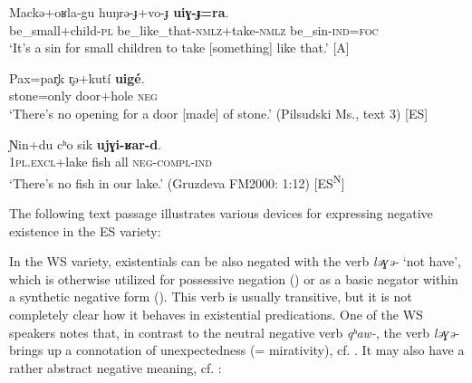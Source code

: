 \documentclass[output=paper,colorlinks,citecolor=brown]{langscibook}
\begin{document}
\ea\label{ex:niv:38}
    \gll Mackə+oʁla-gu huŋrə{}-ɟ+vo-ɟ \textbf{uiɣ{}-ɟ=ra}. \\ 
         be\_small+child-\textsc{pl} be\_like\_that-\textsc{nmlz}+take-\textsc{nmlz} be\_sin-\textsc{ind=foc} \\
    \glt ‘It’s a sin for small children to take [something] like that.’ \citep[225]{Panfilov1965} [A]
\z 

\ea\label{ex:niv:39}
    \gll Pax=par̥k r̥ə+kutí \textbf{uigé}. \\ 
         stone=only door+hole \textsc{neg} \\
    \glt ‘There’s no opening for a door [made] of stone.’ (Pilsudski Ms., text 3) [ES]
\z 

\ea\label{ex:niv:40}
    \gll Ɲin+du cʰo sik \textbf{ujɣi-ʁar-d}. \\ 
         1\textsc{pl}.\textsc{excl}+lake fish all \textsc{neg-compl-ind} \\
    \glt ‘There’s no fish in our lake.’ (Gruzdeva FM2000: 1:12) [ES\textsuperscript{N}]
\z 

The following text passage  illustrates various devices for expressing negative existence in the ES variety:


In the WS variety, existentials can be also negated with the verb \textit{ləɣə{}-} ‘not have’, which is otherwise utilized for possessive negation () or as a basic negator within a synthetic negative form (). This verb is usually transitive, but it is not completely clear how it behaves in existential predications. One of the WS speakers notes that, in contrast to the neutral negative verb \textit{qʰaw{}-}, the verb \textit{ləɣə{}-} brings up a connotation of unexpectedness (= mirativity), cf. . It may also have a rather abstract negative meaning, cf. :
\end{document}

